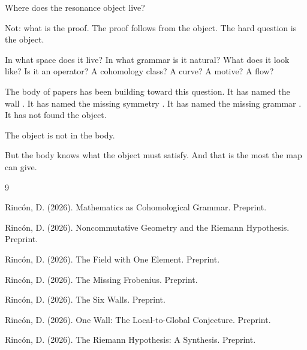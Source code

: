 \documentclass[12pt]{article}
\theoremstyle{definition}
\theoremstyle{remark}
\begin{document}
Where does the resonance object live?

Not: what is the proof.
The proof follows from the object.
The hard question is the object.

In what space does it live?
In what grammar is it natural?
What does it look like?
Is it an operator? A cohomology class? A curve? A motive? A flow?

The body of papers has been building toward this question.
It has named the wall \cite{six_walls, one_wall}.
It has named the missing symmetry \cite{frobenius}.
It has named the missing grammar \cite{f1}.
It has not found the object.

The object is not in the body.

But the body knows what the object must satisfy.
And that is the most the map can give.

\begin{thebibliography}{9}

Rinc\'on, D. (2026).
Mathematics as Cohomological Grammar. Preprint.

Rinc\'on, D. (2026).
Noncommutative Geometry and the Riemann Hypothesis. Preprint.

Rinc\'on, D. (2026).
The Field with One Element. Preprint.

Rinc\'on, D. (2026).
The Missing Frobenius. Preprint.

Rinc\'on, D. (2026).
The Six Walls. Preprint.

Rinc\'on, D. (2026).
One Wall: The Local-to-Global Conjecture. Preprint.

Rinc\'on, D. (2026).
The Riemann Hypothesis: A Synthesis. Preprint.

\end{thebibliography}
\end{document}
